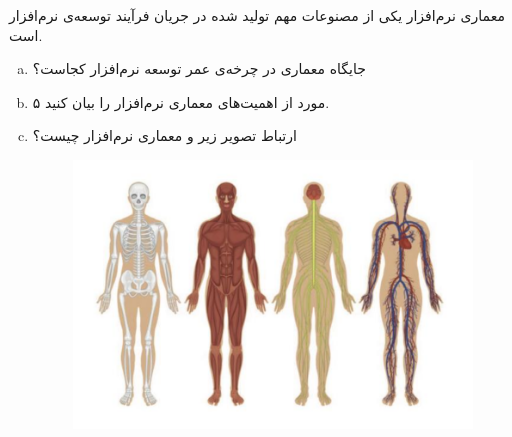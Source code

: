 معماری نرم‌افزار یکی از مصنوعات مهم تولید شده در جریان فرآیند توسعه‌ی نرم‌افزار است.

\begin{enumerate}[a)]
	\item 
 جایگاه معماری در چرخه‌ی عمر توسعه نرم‌افزار کجاست؟
	 \item 
۵ مورد از اهمیت‌های معماری نرم‌افزار را بیان کنید.
	\item
ارتباط تصویر زیر و معماری نرم‌افزار چیست؟
\begin{figure}[!ht]
	\centering
	\includegraphics[scale=0.5]{figs/Q4}
\end{figure}
\end{enumerate}


